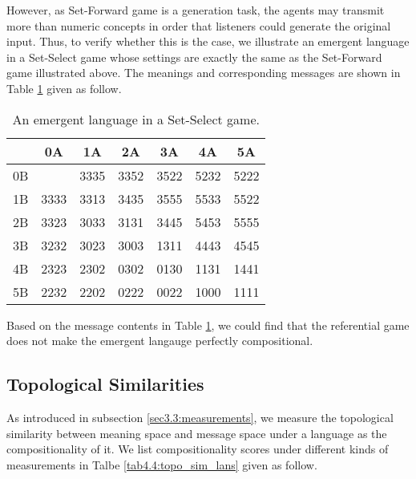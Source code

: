 However, as Set-Forward game is a generation task, the agents may transmit more than numeric concepts in order that listeners could generate the original input. Thus, to verify whether this is the case, we illustrate an emergent language in a Set-Select game whose settings are exactly the same as the Set-Forward game illustrated above. The meanings and corresponding messages are shown in Table \ref{tab4.3:emregent_langauge_referential} given as follow.

\begin{table}[!h]
    \centering
    \begin{tabular}{|c|c|c|c|c|c|c|}
        \hline
           & 0A   & 1A   & 2A   & 3A   & 4A   & 5A   \\ \hline
        0B &      & 3335 & 3352 & 3522 & 5232 & 5222 \\ \hline
        1B & 3333 & 3313 & 3435 & 3555 & 5533 & 5522 \\ \hline
        2B & 3323 & 3033 & 3131 & 3445 & 5453 & 5555 \\ \hline
        3B & 3232 & 3023 & 3003 & 1311 & 4443 & 4545 \\ \hline
        4B & 2323 & 2302 & 0302 & 0130 & 1131 & 1441 \\ \hline
        5B & 2232 & 2202 & 0222 & 0022 & 1000 & 1111 \\ \hline
        \end{tabular}
    \caption{An emergent language in a Set-Select game.}
    \label{tab4.3:emregent_langauge_referential}
\end{table}

Based on the message contents in Table \ref{tab4.3:emregent_langauge_referential}, we could find that the referential game does not make the emergent langauge perfectly compositional.

\subsection{Topological Similarities}
\label{ssec4.2.2:topo_sim}

As introduced in subsection \ref{sec3.3:measurements}, we measure the topological similarity between meaning space and message space under a language as the compositionality of it. We list compositionality scores under different kinds of measurements in Talbe \ref{tab4.4:topo_sim_lans} given as follow.

